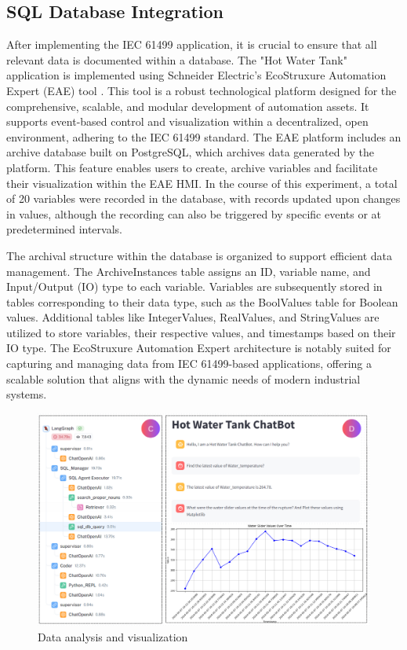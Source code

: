 \documentclass[conference]{IEEEtran}
\begin{document}
\subsection{SQL Database Integration}

After implementing the IEC 61499 application, it is crucial to ensure that all relevant data is documented within a database. The "Hot Water Tank" application is implemented using Schneider Electric's EcoStruxure Automation Expert (EAE) tool \cite{ecostruxure2023}. This tool is a robust technological platform designed for the comprehensive, scalable, and modular development of automation assets. It supports event-based control and visualization within a decentralized, open environment, adhering to the IEC 61499 standard. The EAE platform includes an archive database built on PostgreSQL, which archives data generated by the platform. This feature enables users to create, archive variables and facilitate their visualization within the EAE HMI. In the course of this experiment, a total of 20 variables were recorded in the database, with records updated upon changes in values, although the recording can also be triggered by specific events or at predetermined intervals.

The archival structure within the database is organized to support efficient data management. The ArchiveInstances table assigns an ID, variable name, and Input/Output (IO) type to each variable. Variables are subsequently stored in tables corresponding to their data type, such as the BoolValues table for Boolean values. Additional tables like IntegerValues, RealValues, and StringValues are utilized to store variables, their respective values, and timestamps based on their IO type.  The EcoStruxure Automation Expert architecture is notably suited for capturing and managing data from IEC 61499-based applications, offering a scalable solution that aligns with the dynamic needs of modern industrial systems.


\begin{figure}
    \centering
    \includegraphics[width=.85\textwidth]{images/Result.PNG}
    \caption{Data analysis and visualization}
    \label{fig:results}
\end{figure}
\end{document}
